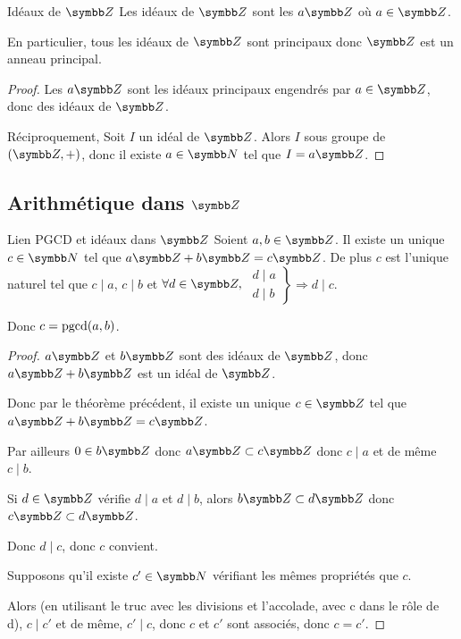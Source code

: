 \begin{theoreme}{Idéaux de $\Z$}{}
    Les idéaux de $\Z$ sont les $a \Z$ où $a \in \Z$.

    En particulier, tous les idéaux de $\Z$ sont principaux donc $\Z$ est un anneau principal.
\end{theoreme}

\begin{proof}
    Les $a \Z$ sont les idéaux principaux engendrés par $a \in \Z$, donc des idéaux de $\Z$.

    Réciproquement, Soit $I$ un idéal de $\Z$. Alors $I$ sous groupe de $(\Z, +)$, donc il existe 
    $a \in \N$ tel que $I = a \Z$.
\end{proof}

\subsection{Arithmétique dans \texorpdfstring{$\Z$}{Z}}

\begin{theoreme}{Lien PGCD et idéaux dans $\Z$}{}
    Soient $a, b \in \Z$. Il existe un unique $c \in \N$ tel que $a \Z + b \Z = c \Z$. 
    De plus $c$ est l'unique naturel tel que $c \mid a $, $c \mid b$ et $\forall d \in \Z, $
    $\left. \begin{aligned}
        d \mid a \\
        d \mid b
    \end{aligned} \right\} \Rightarrow d \mid c$.

    Donc $c = \operatorname{pgcd}(a, b)$.
\end{theoreme}

\begin{proof}
    $a \Z$ et $b \Z$ sont des idéaux de $\Z$, donc $a \Z + b \Z$ est un idéal de $\Z$.

    Donc par le théorème précédent, il existe un unique $c \in \Z$ tel que $a \Z + b \Z = c \Z$.

    Par ailleurs $0 \in b \Z$ donc $a \Z \subset c \Z$ donc $c \mid a $ et de même $c \mid b$.

    Si $d \in \Z$ vérifie $d \mid a$ et $d \mid b$, alors $b \Z \subset d \Z$ donc $c \Z \subset d \Z$. 

    Donc $d \mid c$, donc $c $ convient. 

    \svspace Supposons qu'il existe $c' \in \N$ vérifiant les mêmes propriétés que $c$. 

    Alors (en utilisant le truc avec les divisions et l'accolade, avec c dans le rôle de d), 
    $c \mid c'$ et de même, $c' \mid c$, donc $c$ et $c'$ sont associés, donc $c = c'$.
\end{proof}

